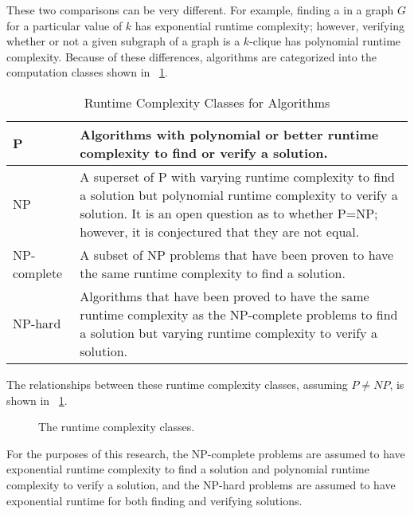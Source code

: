 These two comparisons can be very different.  For example, finding a  in a graph \(G\) for a particular
value of \(k\) has exponential runtime complexity; however, verifying whether or not a given subgraph of a graph is
a \(k\)-clique has polynomial runtime complexity.  Because of these differences, algorithms are categorized into
the computation classes shown in \tablename~\ref{tab:classes}.

\begin{table}[H]
  \centering
  \caption{Runtime Complexity Classes for Algorithms}
  \label{tab:classes}
  \setlength{\extrarowheight}{2ex}
  \begin{tabular}{|m{1in}|m{3in}|}
    \hline
    P & Algorithms with polynomial or better runtime complexity to find or verify a solution. \\
    \hline
    NP & A superset of P with varying runtime complexity to find a solution but polynomial runtime complexity to
    verify a solution.  It is an open question as to whether P=NP; however, it is conjectured that they are not
    equal. \\
    \hline
    NP-complete & A subset of NP problems that have been proven to have the same runtime complexity to find a
    solution. \\
    \hline
    NP-hard & Algorithms that have been proved to have the same runtime complexity as the NP-complete problems to
    find a solution but varying runtime complexity to verify a solution. \\
    \hline
  \end{tabular}
\end{table}

The relationships between these runtime complexity classes, assuming \(P\ne NP\), is shown in
\figurename~\ref{fig:complexity}.

\begin{figure}[H]
  \centering
  \caption{The runtime complexity classes.}
  \label{fig:complexity}
\end{figure}

For the purposes of this research, the NP-complete problems are assumed to have exponential runtime complexity to
find a solution and polynomial runtime complexity to verify a solution, and the NP-hard problems are assumed to
have exponential runtime for both finding and verifying solutions.

